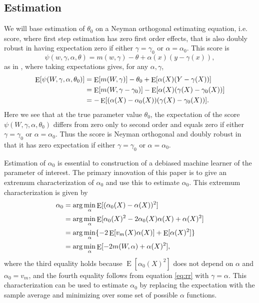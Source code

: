 \documentclass[aos]{imsart}
\numberwithin{equation}{section}
\theoremstyle{plain}
\theoremstyle{remark}
\DeclareMathOperator{\E}{E}
\begin{document}


\subsection{Estimation \label{sec:estim}}
We will base estimation of $\theta_0$ on a Neyman orthogonal estimating equation, i.e. score, where first step estimation has zero first order effects, that is also doubly robust in having expectation zero if either $\gamma=\gamma_0$ or $\alpha=\alpha_0$. This score is
\begin{equation}\label{eq:psi}
\psi(w, \gamma, \alpha, \theta) = m(w, \gamma)- \theta + \alpha(x)(y - \gamma(x)),
\end{equation}
as in \cite{chernozhukov2022locally}, where taking expectations gives, for any $\alpha, \gamma$,
\begin{align}
\E[\psi(W,\gamma,\alpha,\theta_0)] & = \E[m(W,\gamma)] - \theta_0 + \E[\alpha(X)(Y-\gamma(X))] \notag \\
& = \E[m(W,\gamma-\gamma_0)] - \E[\alpha(X)(\gamma(X) - \gamma_0(X))] \notag
\\ & = -\E[(\alpha(X)-\alpha_0(X))(\gamma(X) - \gamma_0(X))].
\end{align}
Here we see that at the true parameter value $\theta_0$, the expectation of the score $\psi(W,\gamma,\alpha,\theta_0)$ differs from zero only to second order and equals zero if either $\gamma=\gamma_0$ or $\alpha=\alpha_0$. Thus the score is Neyman orthogonal and doubly robust in that it has zero expectation if either $\gamma=\gamma_0$ or $\alpha=\alpha_0$.

Estimation of $\alpha_0$ is essential to construction of a debiased machine learner of the parameter of interest. 
The primary innovation of this paper is to give an extremum characterization of $\alpha_0$ and use this to estimate $\alpha_0$. 
This extremum characterization is given by
\begin{align}
\alpha_0 & = \arg\min_\alpha \E[(\alpha_0(X) - \alpha(X))^2] \notag \\
& = \arg\min_\alpha \E[\alpha_0(X)^2 - 2\alpha_0(X)\alpha(X) + \alpha(X)^2] \notag \\
& = \arg\min_\alpha \{ -2\E[v_m(X)\alpha(X)] + \E[\alpha(X)^2] \} \notag \\
& = \arg\min_\alpha \E[-2m(W, \alpha) + \alpha(X)^2], \label{eq:extrem}
\end{align}
where the third equality holds because $\E[\alpha_0(X)^2]$ does not depend on $\alpha$ and $\alpha_0=v_m$, and the fourth equality follows from equation \eqref{eq:rr} with $\gamma=\alpha$. This characterization can be used to estimate $\alpha_0$ by replacing the expectation with the sample average and minimizing over some set of possible $\alpha$ functions.
\end{document}
